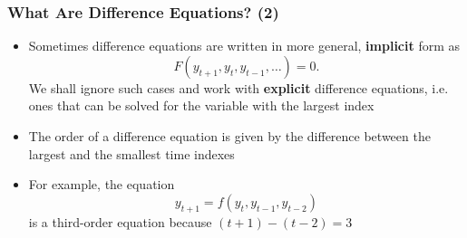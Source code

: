 \documentclass[10pt,usenames,dvipsnames]{beamer}
\theoremstyle{plain}
\theoremstyle{definition}
\begin{document}
%

\begin{frame}[fragile]
	\frametitle{What Are Difference Equations? (2)}
	\begin{itemize}
		\item Sometimes difference equations are written in more general, \textbf{implicit} form as \[ F(y_{t+1},y_t,y_{t-1},\ldots)=0. \]
		We shall ignore such cases and work with \textbf{explicit} difference equations, i.e. ones that can be solved for the variable with the largest index
		\item The order of a difference equation is given by the difference between the largest and the smallest time indexes
		\item For example, the equation
		\[ y_{t+1} = f(y_t, y_{t-1}, y_{t-2}) \]
		is a third-order equation because $(t+1) - (t-2) = 3$
	\end{itemize}
\end{frame}
\end{document}
